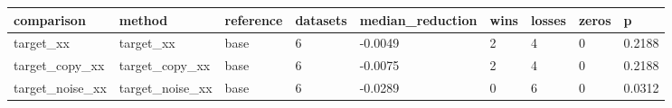 \begin{tabular}{lllllllll}
\toprule
comparison & method & reference & datasets & median\_reduction & wins & losses & zeros & p \\
\midrule
target\_xx & target\_xx & base & 6 & -0.0049 & 2 & 4 & 0 & 0.2188 \\
target\_copy\_xx & target\_copy\_xx & base & 6 & -0.0075 & 2 & 4 & 0 & 0.2188 \\
target\_noise\_xx & target\_noise\_xx & base & 6 & -0.0289 & 0 & 6 & 0 & 0.0312 \\
\bottomrule
\end{tabular}
